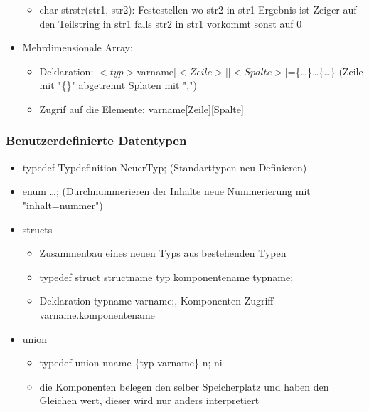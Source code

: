 \documentclass[10pt,a5paper]{article}
\begin{document}
\begin{itemize}
\begin{itemize}
\item char strstr(str1, str2): Festestellen wo str2 in str1 \subitem Ergebnis ist Zeiger auf den Teilstring in str1 falls str2 in str1 vorkommt sonst auf 0
\end{itemize}
\item Mehrdimensionale Array:\begin{itemize}
\item Deklaration:
\subitem\ensuremath{<typ>}varname[\ensuremath{<Zeile>}][\ensuremath{<Spalte>}]=\{\dots \}\dots \{\dots \}   (Zeile mit "\{\}" abgetrennt Splaten mit ",")
\item Zugrif auf die Elemente: varname[Zeile][Spalte]
\end{itemize}
\end{itemize}
\subsubsection{Benutzerdefinierte Datentypen}
\begin{itemize}
\item typedef Typdefinition Neuer\textunderscore Typ; (Standarttypen neu Definieren)
\item enum {\dots}; (Durchnummerieren der Inhalte neue Nummerierung mit "inhalt=nummer")
\item structs\begin{itemize}
\item Zusammenbau eines neuen Typs aus bestehenden Typen
\item typedef struct struct\textunderscore name {typ komponentename} typname;
\item Deklaration typname varname;, Komponenten Zugriff varname.komponentename
\end{itemize}
\item union \begin{itemize}
\item typedef union n\textunderscore name \{typ varname\} n; n\textunderscore i
\item die Komponenten belegen den selber Speicherplatz und haben den Gleichen wert, dieser wird nur anders interpretiert
\end{itemize}
\end{itemize}
\end{document}
